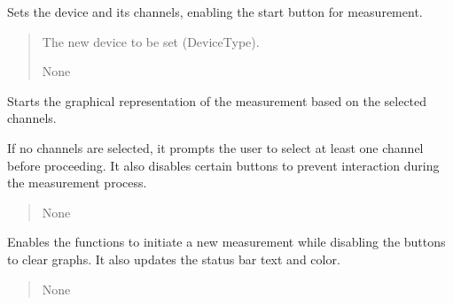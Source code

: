 \documentclass[letterpaper,10pt,english]{sphinxmanual}
\begin{document}
\begin{fulllineitems}
\begin{fulllineitems}
\label{\detokenize{StartStopHist:StartStopHist.StartStopLogic.show_graphic}}
\pysigstartsignatures
{}
\pysigstopsignatures
\sphinxAtStartPar
Sets the device and its channels, enabling the start button for measurement.
\begin{quote}\begin{description}
\sphinxAtStartPar
{} \textendash{} The new device to be set (DeviceType).

\sphinxAtStartPar
None

\end{description}\end{quote}

\end{fulllineitems}


\begin{fulllineitems}
\label{\detokenize{StartStopHist:StartStopHist.StartStopLogic.start_graphic}}
\pysigstartsignatures
{}
\pysigstopsignatures
\sphinxAtStartPar
Starts the graphical representation of the measurement based on the selected channels.

\sphinxAtStartPar
If no channels are selected, it prompts the user to select at least one channel before proceeding. 
It also disables certain buttons to prevent interaction during the measurement process.
\begin{quote}\begin{description}
\sphinxAtStartPar
None

\end{description}\end{quote}

\end{fulllineitems}


\begin{fulllineitems}
\label{\detokenize{StartStopHist:StartStopHist.StartStopLogic.stop_graphic}}
\pysigstartsignatures
{}
\pysigstopsignatures
\sphinxAtStartPar
Enables the functions to initiate a new measurement while disabling the buttons to clear graphs. 
It also updates the status bar text and color.
\begin{quote}\begin{description}
\sphinxAtStartPar
None


\end{description}
\end{quote}
\end{fulllineitems}
\end{fulllineitems}
\end{document}
